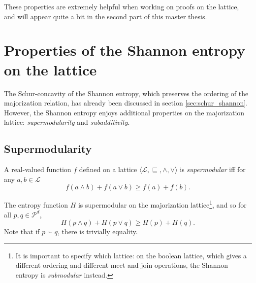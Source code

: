 
These properties are extremely helpful when working on proofs on the lattice, and will appear quite a bit in the second part of this master thesis.



\section{Properties of the Shannon entropy on the lattice}

The Schur-concavity of the Shannon entropy, which preserves the ordering of the majorization relation, has already been discussed in section \ref{sec:schur_shannon}. However, the Shannon entropy enjoys additional properties on the majorization lattice: \textit{supermodularity} and \textit{subadditivity}.



\subsection{Supermodularity} \label{sec:supermodularity}

\begin{definition}
    A real-valued function $f$ defined on a lattice $\langle \mathcal{L}, \sqsubseteq, \wedge, \vee \rangle$ is \textit{supermodular} iff for any $a, b \in \mathcal{L}$
    \begin{equation}
        f(a \wedge b) + f(a \vee b) \geq f(a) + f(b).
    \end{equation}
\end{definition}

\begin{theorem}
    The entropy function $H$ is supermodular on the majorization lattice\footnote{It is important to specify which lattice: on the boolean lattice, which gives a different ordering and different meet and join operations, the Shannon entropy is \textit{submodular} instead.}, and so for all $p, q \in \mathcal{P}^d$,
    \begin{equation} \label{eq:supermodularity}
        H(p \wedge q) + H(p \vee q) \geq H(p) + H(q).
    \end{equation}
    Note that if $p \sim q$, there is trivially equality.
\end{theorem}

